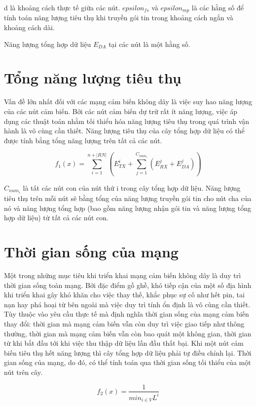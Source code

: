 d là khoảng cách thực tế giữa các nút. $epsilon_{fs}$ và $epsilon_{mp}$ là các hằng số để tính toán năng lượng tiêu thụ khi truyền gói tin trong khoảng cách ngắn và khoảng cách dài.

Năng lượng tổng hợp dữ liệu $E_{DA}$ tại các nút là một hằng số.

\section{Tổng năng lượng tiêu thụ}
Vấn đề lớn nhất đối với các mạng cảm biến không dây là việc suy hao năng lượng của các nút cảm biến. Bởi các nút cảm biến dự trữ rất ít năng lượng, việc áp dụng các thuật toán nhằm tối thiểu hóa năng lượng tiêu thụ trong quá trình vận hành là vô cùng cần thiết. Năng lượng tiêu thụ của cây tổng hợp dữ liệu có thể được tính bằng tổng năng lượng trên tất cả các nút.

\begin{equation}
f_1(x) = \sum_{i=1}^{n + |RN|} (E^i_{TX} + \sum_{j=1}^{C_{num_i}} (E_{RX}^j + E_{DA}^j))
\end{equation}

$C_{num_i}$ là tất các nút con của nút thứ i trong cây tổng hợp dữ liệu. Năng lượng tiêu thụ trên mỗi nút sẽ bằng tổng của năng lượng truyền gói tin cho nút cha của nó và năng lượng tổng hợp (bao gồm năng lượng nhận gói tin và năng lượng tổng hợp dữ liệu) từ tất cả các nút con.

\section{Thời gian sống của mạng}
Một trong những mục tiêu khi triển khai mạng cảm biến không dây là duy trì thời gian sống toàn mạng. Bởi đặc điểm gồ ghề, khó tiếp cận của một số địa hình khi triển khai gây khó khăn cho việc thay thế, khắc phục sự cố như hết pin, tai nạn hay phá hoại từ bên ngoài mà việc duy trì tính ổn định là vô cùng cần thiết. Tùy thuộc vào yêu cầu thực tế mà định nghĩa thời gian sống của mạng cảm biến thay đổi: thời gian mà mạng cảm biến vẫn còn duy trì việc giao tiếp như thông thường, thời gian mà mạng cảm biến vẫn còn bao quát một không gian, thời gian từ khi bắt đầu tới khi việc thu thập dữ liệu lần đầu thất bại. Khi một nút cảm biến tiêu thụ hết năng lượng thì cây tổng hợp dữ liệu phải tự điều chỉnh lại. Thời gian sống của mạng, do đó, có thể tính toán qua thời gian sống tối thiểu của một nút trên cây.

\begin{equation}
f_2(x) = \frac{1}{min_{i \in V}  L^i}
\end{equation}

